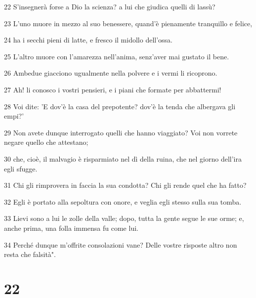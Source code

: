 \par 22 S'insegnerà forse a Dio la scienza? a lui che giudica quelli di lassù?
\par 23 L'uno muore in mezzo al suo benessere, quand'è pienamente tranquillo e felice,
\par 24 ha i secchi pieni di latte, e fresco il midollo dell'ossa.
\par 25 L'altro muore con l'amarezza nell'anima, senz'aver mai gustato il bene.
\par 26 Ambedue giacciono ugualmente nella polvere e i vermi li ricoprono.
\par 27 Ah! li conosco i vostri pensieri, e i piani che formate per abbattermi!
\par 28 Voi dite: 'E dov'è la casa del prepotente? dov'è la tenda che albergava gli empi?'
\par 29 Non avete dunque interrogato quelli che hanno viaggiato? Voi non vorrete negare quello che attestano;
\par 30 che, cioè, il malvagio è risparmiato nel dì della ruina, che nel giorno dell'ira egli sfugge.
\par 31 Chi gli rimprovera in faccia la sua condotta? Chi gli rende quel che ha fatto?
\par 32 Egli è portato alla sepoltura con onore, e veglia egli stesso sulla sua tomba.
\par 33 Lievi sono a lui le zolle della valle; dopo, tutta la gente segue le sue orme; e, anche prima, una folla immensa fu come lui.
\par 34 Perché dunque m'offrite consolazioni vane? Delle vostre risposte altro non resta che falsità".

\chapter{22}

